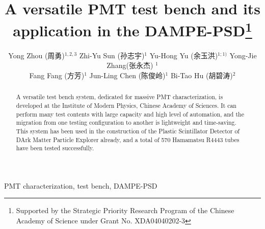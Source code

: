 \documentclass[a4paper,10pt,twoside]{cpc-hepnp}
\begin{document}
\begin{CJK*}{UTF8}{gbsn}






\title{A versatile PMT test bench and its application in the DAMPE-PSD\thanks{Supported by the Strategic Priority Research Program of the Chinese Academy of Science under Grant No. XDA04040202-3}}

\author{%
      Yong Zhou (周勇)$^{1,2,3}$
\quad Zhi-Yu Sun (孙志宇)$^{1}$
\quad Yu-Hong Yu (余玉洪)$^{1;1)}$
\quad Yong-Jie Zhang(张永杰) $^{1}$\\
\quad Fang Fang (方芳)$^{1}$
\quad Jun-Ling Chen (陈俊岭)$^{1}$
\quad Bi-Tao Hu (胡碧涛)$^{2}$
}
\maketitle


\address{%
$^1$ Institute of Modern Physics, Chinese Academy of Sciences,  509 Nanchang Road,  Lanzhou,  730000,  P.R.China\\
$^2$ School of Nuclear Science and Technology,  Lanzhou University,  222 South Tianshui Road,  Lanzhou,  730000,  P.R.China\\
$^3$ Graduate University of the Chinese Academy of Sciences,  19A Yuquan Road,  Beijing,  100049,  P.R.China\\
}


\begin{abstract}
A versatile test bench system, dedicated for massive PMT characterization, is developed at the Institute of Modern Physics, Chinese Academy of Sciences. 
It can perform many test contents with large capacity and high level of automation, and the migration from one testing configuration to another is lightweight and time-saving. 
This system has been used in the construction of the Plastic Scintillator Detector of DArk Matter Particle Explorer already, and a total of 570 Hamamatsu R4443 tubes have been tested successfully.
\end{abstract}


\begin{keyword}
PMT characterization, test bench, DAMPE-PSD
\end{keyword}


\end{CJK*}
\end{document}
